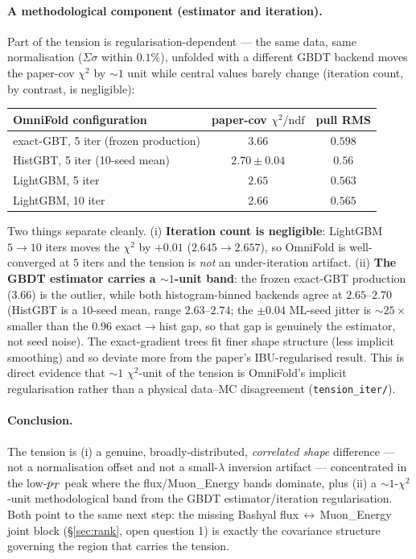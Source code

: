 \paragraph{A methodological component (estimator and iteration).}
Part of the tension is regularisation-dependent --- the same data, same
normalisation ($\Sigma\sigma$ within $0.1\%$), unfolded with a different
GBDT backend moves the paper-cov $\chi^{2}$ by $\sim1$ unit while central
values barely change (iteration count, by contrast, is negligible):
\begin{center}
\begin{tabular}{@{}lcc@{}}
\toprule
OmniFold configuration & paper-cov $\chi^{2}/\mathrm{ndf}$ & pull RMS \\
\midrule
exact-GBT, 5 iter (frozen production) & $3.66$ & $0.598$ \\
HistGBT, 5 iter (10-seed mean) & $2.70\pm0.04$ & $0.56$ \\
LightGBM, 5 iter & $2.65$ & $0.563$ \\
LightGBM, 10 iter & $2.66$ & $0.565$ \\
\bottomrule
\end{tabular}
\end{center}
Two things separate cleanly. (i) \textbf{Iteration count is negligible}:
LightGBM $5\to10$ iters moves the $\chi^{2}$ by $+0.01$ ($2.645\to2.657$),
so OmniFold is well-converged at $5$ iters and the tension is \emph{not}
an under-iteration artifact. (ii) \textbf{The GBDT estimator carries a
$\sim1$-unit band}: the frozen exact-GBT production ($3.66$) is the
outlier, while both histogram-binned backends agree at $2.65$--$2.70$
(HistGBT is a $10$-seed mean, range $2.63$--$2.74$; the $\pm0.04$ ML-seed
jitter is $\sim25\times$ smaller than the $0.96$ exact$\to$hist gap, so
that gap is genuinely the estimator, not seed noise). The exact-gradient
trees fit finer shape structure (less implicit smoothing) and so deviate
more from the paper's IBU-regularised result. This is direct evidence
that $\sim1$ $\chi^{2}$-unit of the tension is OmniFold's implicit
regularisation rather than a physical data--MC disagreement
(\texttt{tension\_iter/}).

\paragraph{Conclusion.}
The tension is (i) a genuine, broadly-distributed, \emph{correlated shape}
difference --- not a normalisation offset and not a small-$\lambda$
inversion artifact --- concentrated in the low-$p_{T}$ peak where the
flux/Muon\_Energy bands dominate, plus (ii) a $\sim1$-$\chi^{2}$-unit
methodological band from the GBDT estimator/iteration regularisation.
Both point to the same next step: the missing Bashyal
flux\,$\leftrightarrow$\,Muon\_Energy joint block (\S\ref{sec:rank},
open question 1) is exactly the covariance structure governing the region
that carries the tension.

